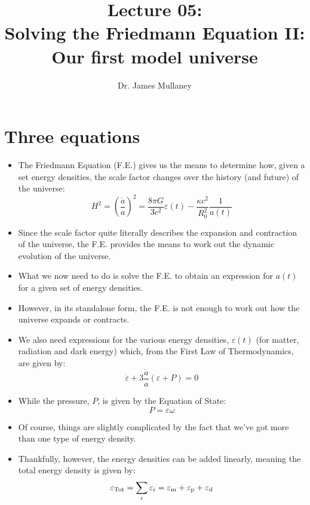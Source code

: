 \documentclass[11pt]{article}
\newcommand{\vep}[1]{\ensuremath{\varepsilon#1}}
\begin{document}
 
\title{Lecture 05:\\Solving the Friedmann Equation {\sc II}:\\
Our first model universe}
\author{Dr. James Mullaney}
\maketitle
\section{Three equations}
\begin{itemize}
\item The Friedmann Equation (F.E.) gives us the means to determine how, given a set energy densities, the scale factor changes over the history (and future) of the universe:
\begin{equation}
H^2 = \left(\frac{\dot{a}}{a}\right)^2 = \frac{8\pi G}{3c^2}\vep{(t)} - \frac{\kappa c^2}{R_0^2}\frac{1}{a(t)}
\end{equation}
\item Since the scale factor quite literally describes the expansion and contraction of the universe, the F.E. provides the means to work out the dynamic evolution of the universe.
\item What we now need to do is solve the F.E. to obtain an expression for $a(t)$ for a given set of energy densities.
\item However, in its standalone form, the F.E. is not enough to work out how the universe expands or contracts.
\item We also need expressions for the various energy densities, \vep{(t)} (for matter, radiation and dark energy) which, from the First Law of Thermodynamics, are given by:
\begin{equation}
\dot{\vep{}} + 3\frac{\dot{a}}{a}(\vep{} + P) = 0
\end{equation}
\item While the pressure, $P$, is given by the Equation of State:
\begin{equation}
        P = \vep{}\omega
\end{equation}
\item Of course, things are slightly complicated by the fact that we've got more than one type of energy density.
\item Thankfully, however, the energy densities can be added linearly, meaning the total energy density is given by:
\begin{equation}
\vep{_{\rm Tot}} = \sum_i\vep{_{i}} = \vep{_{\rm m}} + \vep{_{\rm p}} + \vep{_{\rm d}}

\end{equation}
\end{itemize}
\end{document}
